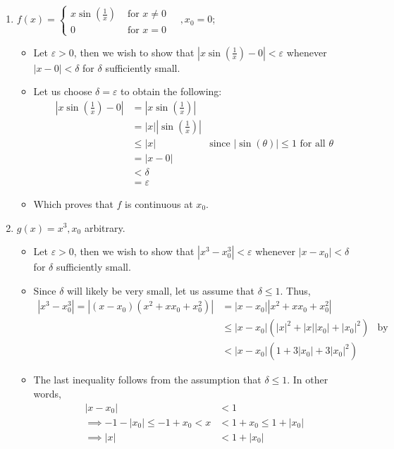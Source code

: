 \documentclass[10pt,a4paper]{article}
\theoremstyle{definition}
\begin{document}
\begin{enumerate}[label = (\alph*)]
\begin{itemize}
	\end{itemize}
\item $\displaystyle f(x) = 
		\begin{cases}
			x\sin\left(\frac{1}{x}\right) &\text{ for } x \neq 0\\
			0 &\text{ for } x = 0
		\end{cases} \quad ,x_0 = 0$;
	\begin{itemize}
	\item Let $\varepsilon > 0$, then we wish to show that $|x\sin\left(\frac{1}{x}\right) - 0| < \varepsilon$ whenever $|x - 0| < \delta$ for $\delta$ sufficiently small. 
	\item Let us choose $\delta = \varepsilon$ to obtain the following:
	\begin{align*}
	\left|x\sin\left(\frac{1}{x}\right) - 0\right| &= \left|x\sin\left(\frac{1}{x}\right)\right|\\
	&= |x|\left|\sin\left(\frac{1}{x}\right)\right|\\
	&\leq |x| &\text{since $|\sin(\theta)| \leq 1$ for all $\theta$}\\
	&= |x - 0|\\
	&< \delta\\
	&= \varepsilon
	\end{align*}
	\item Which proves that $f$ is continuous at $x_0$.
	\end{itemize}
\item $g(x) = x^3, x_0$ arbitrary.
	\begin{itemize}
	\item Let $\varepsilon > 0$, then we wish to show that $|x^3 - x_0^3| < \varepsilon$ whenever $|x - x_0| < \delta$ for $\delta$ sufficiently small. 
	\item Since $\delta$ will likely be very small, let us assume that $\delta \leq 1$. Thus, 
	\begin{align*}
	|x^3 - x_0^3| = |(x - x_0)(x^2 + xx_0 + x_0^2)| &= |x - x_0||x^2 + xx_0 + x_0^2|\\
	&\leq |x - x_0|(|x|^2 + |x||x_0| + |x_0|^2) &\text{by Triangle Inequality}\\
	&< |x - x_0|(1 + 3|x_0| + 3|x_0|^2)
	\end{align*}
	\item The last inequality follows from the assumption that $\delta \leq 1$. In other words,
	\begin{align*}
	|x - x_0| &< 1\\
	\implies -1 - |x_0| \leq -1 + x_0 < x &< 1 + x_0 \leq 1 + |x_0|\\ 			\implies |x| &< 1 + |x_0|\\

\end{align*}
\end{itemize}
\end{enumerate}
\end{document}
